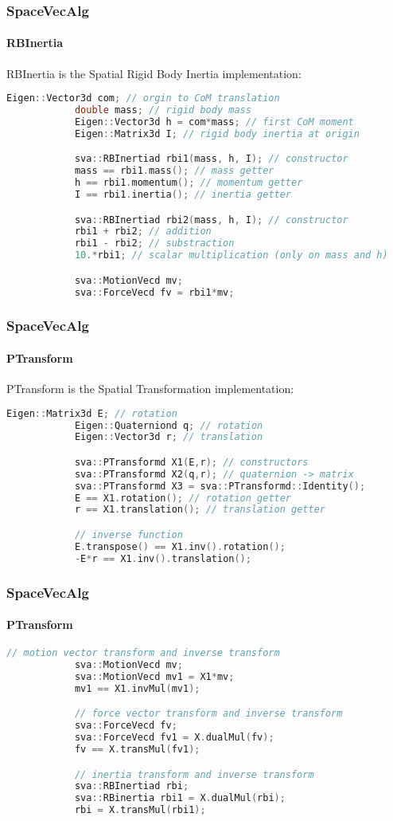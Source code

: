 \documentclass{beamer}
\begin{document}
  	\begin{frame}[fragile]
		\frametitle{SpaceVecAlg}
		\framesubtitle{RBInertia}
		RBInertia is the Spatial Rigid Body Inertia implementation:
		\begin{lstlisting}[language=C++]
			Eigen::Vector3d com; // orgin to CoM translation
			double mass; // rigid body mass
			Eigen::Vector3d h = com*mass; // first CoM moment
			Eigen::Matrix3d I; // rigid body inertia at origin

			sva::RBInertiad rbi1(mass, h, I); // constructor
			mass == rbi1.mass(); // mass getter
			h == rbi1.momentum(); // momentum getter
			I == rbi1.inertia(); // inertia getter

			sva::RBInertiad rbi2(mass, h, I); // constructor
			rbi1 + rbi2; // addition
			rbi1 - rbi2; // substraction
			10.*rbi1; // scalar multiplication (only on mass and h)

			sva::MotionVecd mv;
			sva::ForceVecd fv = rbi1*mv;
		\end{lstlisting}
	\end{frame}


  	\begin{frame}[fragile]
		\frametitle{SpaceVecAlg}
		\framesubtitle{PTransform}
		PTransform is the Spatial Transformation implementation:
		\begin{lstlisting}[language=C++]
			Eigen::Matrix3d E; // rotation
			Eigen::Quaterniond q; // rotation
			Eigen::Vector3d r; // translation

			sva::PTransformd X1(E,r); // constructors
			sva::PTransformd X2(q,r); // quaternion -> matrix
			sva::PTransformd X3 = sva::PTransformd::Identity();
			E == X1.rotation(); // rotation getter
			r == X1.translation(); // translation getter

			// inverse function
			E.transpose() == X1.inv().rotation();
			-E*r == X1.inv().translation();
		\end{lstlisting}
	\end{frame}
  	\begin{frame}[fragile]
		\frametitle{SpaceVecAlg}
		\framesubtitle{PTransform}
		\begin{lstlisting}[language=C++]
			// motion vector transform and inverse transform
			sva::MotionVecd mv;
			sva::MotionVecd mv1 = X1*mv;
			mv1 == X1.invMul(mv1);

			// force vector transform and inverse transform
			sva::ForceVecd fv;
			sva::ForceVecd fv1 = X.dualMul(fv);
			fv == X.transMul(fv1);

			// inertia transform and inverse transform
			sva::RBInertiad rbi;
			sva::RBinertia rbi1 = X.dualMul(rbi);
			rbi = X.transMul(rbi1);
		\end{lstlisting}
	\end{frame}
\end{document}
